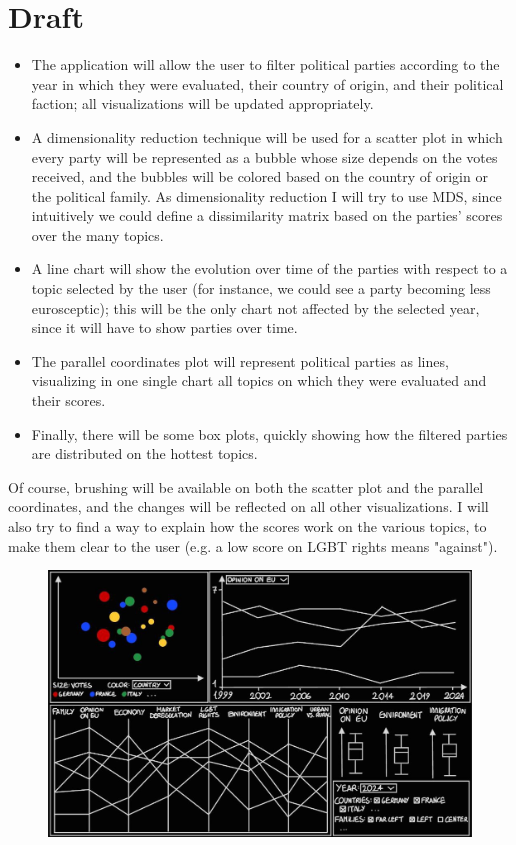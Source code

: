 \documentclass[]{article}
\begin{document}
\section{Draft}
\begin{itemize}
	\item The application will allow the user to filter political parties according to the year in which they were evaluated, their country of origin, and their political faction; all visualizations will be updated appropriately.
	\item A dimensionality reduction technique will be used for a scatter plot in which every party will be represented as a bubble whose size depends on the votes received, and the bubbles will be colored based on the country of origin or the political family. As dimensionality reduction I will try to use MDS, since intuitively we could define a dissimilarity matrix based on the parties' scores over the many topics.
	\item A line chart will show the evolution over time of the parties with respect to a topic selected by the user (for instance, we could see a party becoming less eurosceptic); this will be the only chart not affected by the selected year, since it will have to show parties over time.
	\item The parallel coordinates plot will represent political parties as lines, visualizing in one single chart all topics on which they were evaluated and their scores.
	\item Finally, there will be some box plots, quickly showing how the filtered parties are distributed on the hottest topics.
\end{itemize}
Of course, brushing will be available on both the scatter plot and the parallel coordinates, and the changes will be reflected on all other visualizations. I will also try to find a way to explain how the scores work on the various topics, to make them clear to the user (e.g. a low score on LGBT rights means "against").
\begin{figure}[h]
	\centering
	\includegraphics[scale=0.4]{draft.png}
\end{figure}
	
\end{document}

